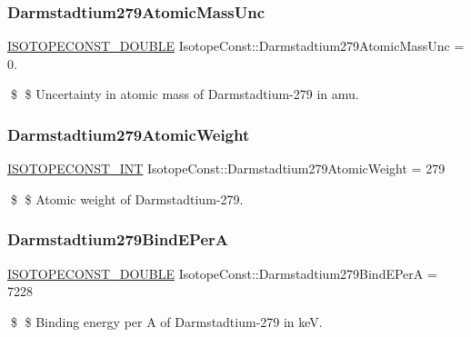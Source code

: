 \subsubsection{\texorpdfstring{Darmstadtium279\+Atomic\+Mass\+Unc}{Darmstadtium279AtomicMassUnc}}
{\footnotesize\ttfamily \mbox{\hyperlink{group___isotope_const-_macros_ga8f45a7272ce02c0b4c65c44636ed719a}{I\+S\+O\+T\+O\+P\+E\+C\+O\+N\+S\+T\+\_\+\+D\+O\+U\+B\+LE}} Isotope\+Const\+::\+Darmstadtium279\+Atomic\+Mass\+Unc = 0.}

\$ \$ Uncertainty in atomic mass of Darmstadtium-\/279 in amu. \mbox{\label{group___isotope_const-_darmstadtium-_ds279_ga5212419980e50dc7cb75cdc37116db47}} 
\subsubsection{\texorpdfstring{Darmstadtium279\+Atomic\+Weight}{Darmstadtium279AtomicWeight}}
{\footnotesize\ttfamily \mbox{\hyperlink{group___isotope_const-_macros_ga5f18360b3e99483a35c32d789e62621c}{I\+S\+O\+T\+O\+P\+E\+C\+O\+N\+S\+T\+\_\+\+I\+NT}} Isotope\+Const\+::\+Darmstadtium279\+Atomic\+Weight = 279}

\$ \$ Atomic weight of Darmstadtium-\/279. \mbox{\label{group___isotope_const-_darmstadtium-_ds279_ga7b18ea757f00251590bfc9ff1e5528d5}} 
\subsubsection{\texorpdfstring{Darmstadtium279\+Bind\+E\+PerA}{Darmstadtium279BindEPerA}}
{\footnotesize\ttfamily \mbox{\hyperlink{group___isotope_const-_macros_ga8f45a7272ce02c0b4c65c44636ed719a}{I\+S\+O\+T\+O\+P\+E\+C\+O\+N\+S\+T\+\_\+\+D\+O\+U\+B\+LE}} Isotope\+Const\+::\+Darmstadtium279\+Bind\+E\+PerA = 7228}

\$ \$ Binding energy per A of Darmstadtium-\/279 in keV. \mbox{\label{group___isotope_const-_darmstadtium-_ds279_ga41af349594b1c10764010a4ea667b6cc}} 
